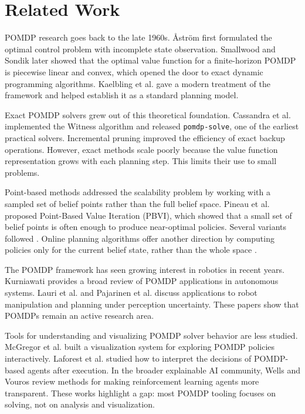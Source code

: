 \section{Related Work}

POMDP research goes back to the late 1960s.
\AA{}str\"{o}m \cite{astrom1965optimal} first formulated the optimal control problem with incomplete state observation.
Smallwood and Sondik \cite{smallwood1973optimal} later showed that the optimal value function for a finite-horizon POMDP is piecewise linear and convex, which opened the door to exact dynamic programming algorithms.
Kaelbling et al. \cite{kaelblingPlanningActingPartially1998} gave a modern treatment of the framework and helped establish it as a standard planning model.

Exact POMDP solvers grew out of this theoretical foundation.
Cassandra et al. \cite{cassandra1994acting} implemented the Witness algorithm and released \texttt{pomdp-solve}, one of the earliest practical solvers.
Incremental pruning \cite{incrementalPruningNotes} improved the efficiency of exact backup operations.
However, exact methods scale poorly because the value function representation grows with each planning step.
This limits their use to small problems.

Point-based methods addressed the scalability problem by working with a sampled set of belief points rather than the full belief space.
Pineau et al. \cite{pineauPointbasedValueIteration} proposed Point-Based Value Iteration (PBVI), which showed that a small set of belief points is often enough to produce near-optimal policies.
Several variants followed \cite{shaniSurveyPointbasedPOMDP2013}.
Online planning algorithms offer another direction by computing policies only for the current belief state, rather than the whole space \cite{onlinePlanningAlgorithmsPOMDPs}.

The POMDP framework has seen growing interest in robotics in recent years.
Kurniawati \cite{kurniawatiPartiallyObservableMarkov2022} provides a broad review of POMDP applications in autonomous systems.
Lauri et al. \cite{lauriPartiallyObservableMarkov2023} and Pajarinen et al. \cite{pajarinenPOMDPPlanningObject2023} discuss applications to robot manipulation and planning under perception uncertainty.
These papers show that POMDPs remain an active research area.

Tools for understanding and visualizing POMDP solver behavior are less studied.
McGregor et al. \cite{mcgregorInteractiveVisualizationTesting2017} built a visualization system for exploring POMDP policies interactively.
Laforest et al. \cite{laforestPostHocInterpretationPOMDP} studied how to interpret the decisions of POMDP-based agents after execution.
In the broader explainable AI community, Wells \cite{wellsExplainableAIReinforcement2021} and Vouros \cite{vourosExplainableDeepReinforcement2023} review methods for making reinforcement learning agents more transparent.
These works highlight a gap: most POMDP tooling focuses on solving, not on analysis and visualization.

